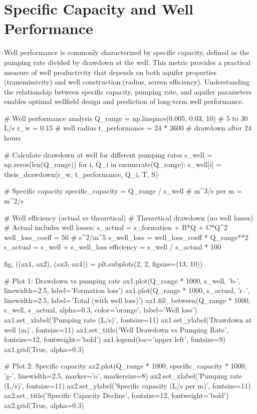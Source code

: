 \documentclass[a4paper, 11pt]{article}
\begin{document}
\section{Specific Capacity and Well Performance}

Well performance is commonly characterized by specific capacity, defined as the pumping rate
divided by drawdown at the well. This metric provides a practical measure of well productivity
that depends on both aquifer properties (transmissivity) and well construction (radius, screen
efficiency). Understanding the relationship between specific capacity, pumping rate, and aquifer
parameters enables optimal wellfield design and prediction of long-term well performance.

\begin{pycode}
# Well performance analysis
Q_range = np.linspace(0.005, 0.03, 10)  # 5 to 30 L/s
r_w = 0.15  # well radius
t_performance = 24 * 3600  # drawdown after 24 hours

# Calculate drawdown at well for different pumping rates
s_well = np.zeros(len(Q_range))
for i, Q_i in enumerate(Q_range):
    s_well[i] = theis_drawdown(r_w, t_performance, Q_i, T, S)

# Specific capacity
specific_capacity = Q_range / s_well  # m^3/s per m = m^2/s

# Well efficiency (actual vs theoretical)
# Theoretical drawdown (no well losses)
# Actual includes well losses: s_actual = s_formation + B*Q + C*Q^2
well_loss_coeff = 50  # s^2/m^5
s_well_loss = well_loss_coeff * Q_range**2
s_actual = s_well + s_well_loss
efficiency = s_well / s_actual * 100

fig, ((ax1, ax2), (ax3, ax4)) = plt.subplots(2, 2, figsize=(13, 10))

# Plot 1: Drawdown vs pumping rate
ax1.plot(Q_range * 1000, s_well, 'b-', linewidth=2.5, label='Formation loss')
ax1.plot(Q_range * 1000, s_actual, 'r--', linewidth=2.5, label='Total (with well loss)')
ax1.fill_between(Q_range * 1000, s_well, s_actual, alpha=0.3, color='orange', label='Well loss')
ax1.set_xlabel('Pumping rate (L/s)', fontsize=11)
ax1.set_ylabel('Drawdown at well (m)', fontsize=11)
ax1.set_title('Well Drawdown vs Pumping Rate', fontsize=12, fontweight='bold')
ax1.legend(loc='upper left', fontsize=9)
ax1.grid(True, alpha=0.3)

# Plot 2: Specific capacity
ax2.plot(Q_range * 1000, specific_capacity * 1000, 'g-', linewidth=2.5, marker='o', markersize=8)
ax2.set_xlabel('Pumping rate (L/s)', fontsize=11)
ax2.set_ylabel('Specific capacity (L/s per m)', fontsize=11)
ax2.set_title('Specific Capacity Decline', fontsize=12, fontweight='bold')
ax2.grid(True, alpha=0.3)


\end{pycode}
\end{document}
